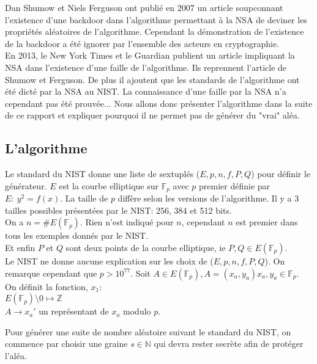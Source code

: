 \documentclass[a4paper,11pt]{report}
\begin{document}
	  
	  Dan Shumow et Niels Ferguson ont publi\'e en 2007 un article soupconnant l'existence d'une backdoor dans %
	  l'algorithme permettant \`a la NSA de deviner les propri\'et\'es al\'eatoires de l'algorithme. Cependant la d\'emonstration de l'existence de la backdoor a \'et\'e ignorer par %
	  l'ensemble des acteurs en cryptographie.\\
	   En 2013, le New York Times et le Guardian publient un article impliquant la NSA dans %
	   l'existence d'une faille de l'algorithme. Ils reprennent l'article de Shumow et Ferguson. De plus il ajoutent que les standards de l'algorithme ont \'et\'e %
	   dict\'e par la NSA au NIST. La connaissance d'une faille par la NSA n'a cependant pas \'et\'e %
	   prouv\'ee...
		Nous allons donc pr\'esenter l'algorithme dans la suite de ce rapport et expliquer pourquoi %
		il ne permet pas de g\'en\'erer du "vrai" al\'ea.
		\subsection{L'algorithme}
		
		Le standard du NIST donne une liste de sextupl\'es ($E,p,n,f,P,Q$) pour d\'efinir le g\'en\'erateur. %
		$E$ est la courbe elliptique sur $\mathbb F_p$ avec $p$ premier d\'efinie par  %
		$E:~y^2=f(x)$. La taille de $p$ diff\`ere selon les versions de l'algorithme. Il y a %
		3 tailles possibles pr\'esent\'ees par le NIST: 256, 384 et 512 bits.\\
		On a $n=\#E(\mathbb F_p)$. Rien n'est indiqu\'e pour $n$, cependant %
		$n$ est premier dans tous les exemples donn\'es par le NIST. \\
		Et enfin $P$ et $Q$ sont deux points de la courbe elliptique, ie $P,Q \in E(\mathbb F_p)$.\\
		
		
		Le NIST ne donne aucune explication sur les choix de ($E,p,n,f,P,Q$). On remarque cependant que $p > 10^{77}$.
		Soit $A \in E(\mathbb F_p), A=(x_a, y_a) x_a,y_a \in \mathbb F_p$.\\
		On d\'efinit la fonction, $x_1$:\\
		$E(\mathbb F_p)\setminus0 \longmapsto \mathbb{Z}$\\
		$A \rightarrow x_a'$ un repr\'esentant de $x_a$ modulo $p$.		
		
		Pour g\'en\'erer une suite de nombre al\'eatoire suivant le standard du NIST, on commence %
		par choisir une graine $s \in \mathbb{N}$ qui devra rester secr\`ete afin de prot\'eger %
		l'al\'ea. 		\\
		
\end{document}
